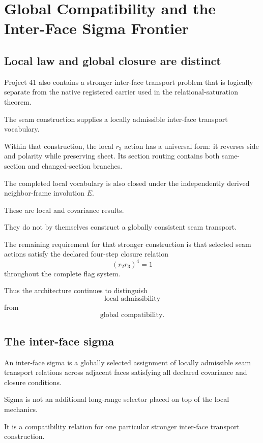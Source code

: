 \section{Global Compatibility and the Inter-Face Sigma Frontier}

\subsection{Local law and global closure are distinct}

Project 41 also contains a stronger inter-face transport problem that
is logically separate from the native registered carrier used in the
relational-saturation theorem.

The seam construction supplies a locally admissible inter-face
transport vocabulary.

Within that construction, the local \(r_3\) action has a universal
form: it reverses side and polarity while preserving sheet.  Its
section routing contains both same-section and changed-section
branches.

The completed local vocabulary is also closed under the independently
derived neighbor-frame involution \(E\).

These are local and covariance results.

They do not by themselves construct a globally consistent seam
transport.

The remaining requirement for that stronger construction is that
selected seam actions satisfy the declared four-step closure relation
\[
(r_2r_3)^4=1
\]
throughout the complete flag system.

Thus the architecture continues to distinguish
\[
\text{local admissibility}
\]
from
\[
\text{global compatibility}.
\]

\subsection{The inter-face sigma}

\begin{definition}
An inter-face sigma is a globally selected assignment of locally
admissible seam transport relations across adjacent faces satisfying
all declared covariance and closure conditions.
\end{definition}

Sigma is not an additional long-range selector placed on top of the
local mechanics.

It is a compatibility relation for one particular stronger
inter-face transport construction.

